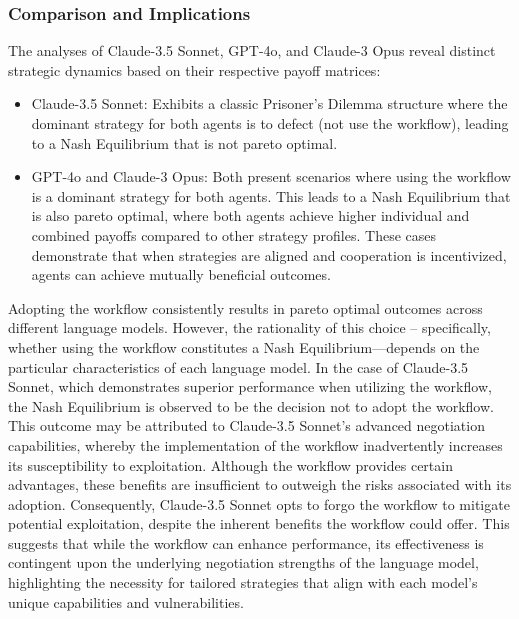 \subsubsection{Comparison and Implications}
The analyses of Claude-3.5 Sonnet, GPT-4o, and Claude-3 Opus reveal distinct strategic dynamics based on their respective payoff matrices:
\begin{itemize}
    \item Claude-3.5 Sonnet: Exhibits a classic Prisoner's Dilemma structure where the dominant strategy for both agents is to defect (not use the workflow), leading to a Nash Equilibrium that is not pareto optimal. 
    \item GPT-4o and Claude-3 Opus: Both present scenarios where using the workflow is a dominant strategy for both agents. This leads to a Nash Equilibrium that is also pareto optimal, where both agents achieve higher individual and combined payoffs compared to other strategy profiles. These cases demonstrate that when strategies are aligned and cooperation is incentivized, agents can achieve mutually beneficial outcomes.
\end{itemize}

Adopting the workflow consistently results in pareto optimal outcomes across different language models. However, the rationality of this choice -- specifically, whether using the workflow constitutes a Nash Equilibrium—depends on the particular characteristics of each language model. In the case of Claude-3.5 Sonnet, which demonstrates superior performance when utilizing the workflow, the Nash Equilibrium is observed to be the decision not to adopt the workflow. This outcome may be attributed to Claude-3.5 Sonnet's advanced negotiation capabilities, whereby the implementation of the workflow inadvertently increases its susceptibility to exploitation. Although the workflow provides certain advantages, these benefits are insufficient to outweigh the risks associated with its adoption. Consequently, Claude-3.5 Sonnet opts to forgo the workflow to mitigate potential exploitation, despite the inherent benefits the workflow could offer. This suggests that while the workflow can enhance performance, its effectiveness is contingent upon the underlying negotiation strengths of the language model, highlighting the necessity for tailored strategies that align with each model's unique capabilities and vulnerabilities.

